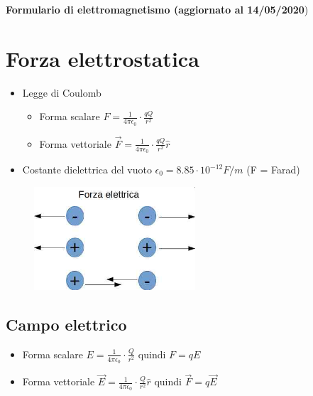 \documentclass[17pt]{article}
\begin{document}
\begin{center}
	{\bf Formulario di elettromagnetismo (aggiornato al 14/05/2020})
\end{center}


\section{Forza elettrostatica}


\begin{itemize}
	\item Legge di Coulomb         
		\begin{itemize}
			\item Forma scalare $F = \frac{1}{4\pi\epsilon_0}\cdot\frac{qQ}{r^2}$
			\item Forma vettoriale $\vec{F} = \frac{1}{4\pi\epsilon_0}\cdot\frac{qQ}{r^2}\hat{r}$
		\end{itemize}			
	  
	\item Costante dielettrica del vuoto        $\epsilon_0 = 8.85\cdot 10^{-12}F/m$   (F = Farad)
\end{itemize}



\begin{figure}[th]
\includegraphics[width=6cm]{forzaElettrica.jpg}
\centering
\end{figure}






\subsection{Campo elettrico}

      
\begin{itemize}
	\item Forma scalare $E = \frac{1}{4\pi\epsilon_0}\cdot\frac{Q}{r^2}$ quindi $F = qE$
	\item Forma vettoriale $\vec{E} = \frac{1}{4\pi\epsilon_0}\cdot\frac{Q}{r^2}\hat{r}$ quindi $\vec{F} = q\vec{E}$
\end{itemize}			
\end{document}
